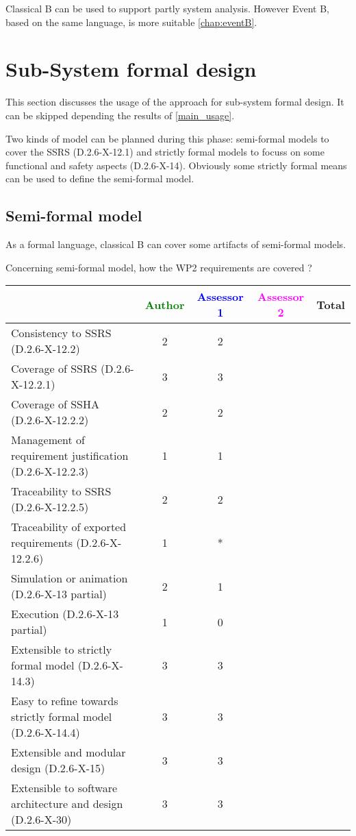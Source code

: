 \begin{author_comment}
Classical B can be used to  support partly  system analysis. However Event B, based on the same language, is more suitable \ref{chap:eventB}.
\end{author_comment}

\section{Sub-System formal design}
This section discusses the usage of the approach for sub-system formal design.
It can be skipped depending the results of \ref{main_usage}.

Two kinds of model can be planned during this phase: semi-formal models to  cover the SSRS (D.2.6-X-12.1) and strictly formal  models to  focuss on some functional and safety aspects (D.2.6-X-14).  Obviously some strictly  formal means can be used to define the semi-formal  model.

\subsection{Semi-formal model}


\begin{author_comment}
As a formal language, classical B  can cover some artifacts of semi-formal models.
\end{author_comment}

Concerning semi-formal model, how the WP2 requirements are covered ?

\begin{tabular}{|l | c | c | c | c|}
\hline
& \textcolor{green}{Author} & \textcolor{blue}{Assessor 1} & \textcolor{magenta}{Assessor 2} & Total \\
\hline 
Consistency to SSRS (D.2.6-X-12.2) & 2 & 2 & &  \\
\hline
Coverage of SSRS (D.2.6-X-12.2.1)  & 3 & 3 & &  \\
\hline
Coverage of SSHA (D.2.6-X-12.2.2)  & 2 & 2 & &  \\
\hline
Management of requirement justification (D.2.6-X-12.2.3)  & 1 & 1 & &  \\
\hline
Traceability to  SSRS (D.2.6-X-12.2.5)  & 2 & 2 & &  \\
\hline
Traceability of exported requirements (D.2.6-X-12.2.6)  & 1 & * & &  \\
\hline
Simulation or animation (D.2.6-X-13 partial)  & 2 & 1 & &  \\
\hline
Execution (D.2.6-X-13 partial)  & 1 & 0 & &  \\
\hline
Extensible to strictly formal model (D.2.6-X-14.3) & 3 & 3 & &  \\
\hline
Easy to  refine towards strictly formal model (D.2.6-X-14.4) & 3 & 3 & &  \\
\hline
Extensible and modular design (D.2.6-X-15)  & 3 & 3 & &  \\
\hline
Extensible to software architecture and design (D.2.6-X-30)   & 3 & 3 & &  \\
\hline
\end{tabular}


